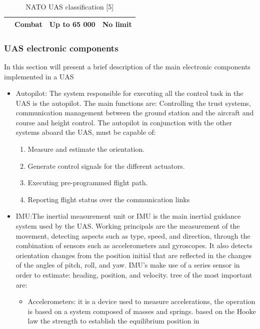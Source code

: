 \begin{table}[H]
\begin{tabular}{|c|c|c|c|}
                                                                                         & Combat                                                                          & Up to 65 000            & No limit        \\ \hline
\end{tabular}
\caption{NATO UAS classification [5]}
\label{table:NATO UAS classification}
\end{table}
\subsubsection{UAS electronic components}	
In this section will present a brief description of the main electronic components implemented in a UAS
\begin{itemize}
\item Autopilot: The system responsible for executing all the control task in the UAS is the autopilot. The main functions are: Controlling the trust systems, communication management between the ground station and the aircraft and course and height control.
The autopilot in conjunction with the other systems aboard the UAS, must be capable of: \begin{enumerate}
\item Measure and estimate the orientation.
\item Generate control signals for the different actuators.
\item Executing pre-programmed flight path.
\item Reporting flight status over the communication links 
\end{enumerate}
\item IMU:The inertial measurement unit or IMU is the main inertial guidance system used by the UAS. Working principals are the measurement of the movement, detecting aspects such as type, speed, and direction, through the combination of sensors such as accelerometers and gyroscopes. It also detects orientation changes from the position initial that are reflected in the changes of the angles of pitch, roll, and yaw. \cite{Inertial}
IMU's make use of a series sensor in order to estimate: heading, position, and velocity\cite{IMU}. tree of the most important are\cite{IMU}:
\begin{itemize}
\item Accelerometers: it is a device used to measure accelerations, the operation is based on a system composed of masses and springs. based on the Hooke law the strength to establish the equilibrium position in

\end{itemize}
\end{itemize}
